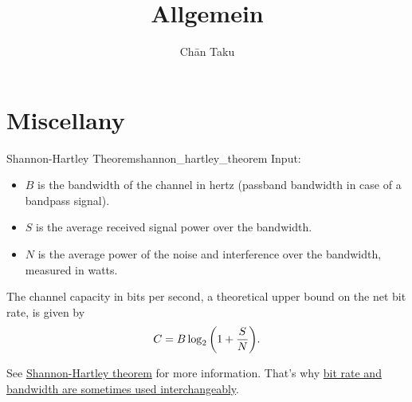 \documentclass{article}
\title{Allgemein}
\author{Ch\=an Taku}
\begin{document}
\maketitle

\section{Miscellany}

\begin{theorem}{Shannon-Hartley Theorem}{shannon_hartley_theorem}
    Input:
    \begin{itemize}
        \item $B$ is the bandwidth of the channel in hertz (passband bandwidth in case of a bandpass signal).
        \item $S$ is the average received signal power over the bandwidth.
        \item $N$ is the average power of the noise and interference over the bandwidth, measured in watts.
    \end{itemize}
    The channel capacity in bits per second, a theoretical upper bound on the net bit rate, is given by
    \[ C = B \log_2\qty(1+\frac{S}{N}). \]
\end{theorem}

See \href{https://en.wikipedia.org/wiki/Shannon%E2%80%93Hartley_theorem}{Shannon-Hartley theorem} for more information.
That's why \href{https://electronics.stackexchange.com/questions/272658/why-does-more-bandwidth-guarantee-high-bit-rate}{bit rate and bandwidth are sometimes used interchangeably}.

% 
% 
\end{document}
